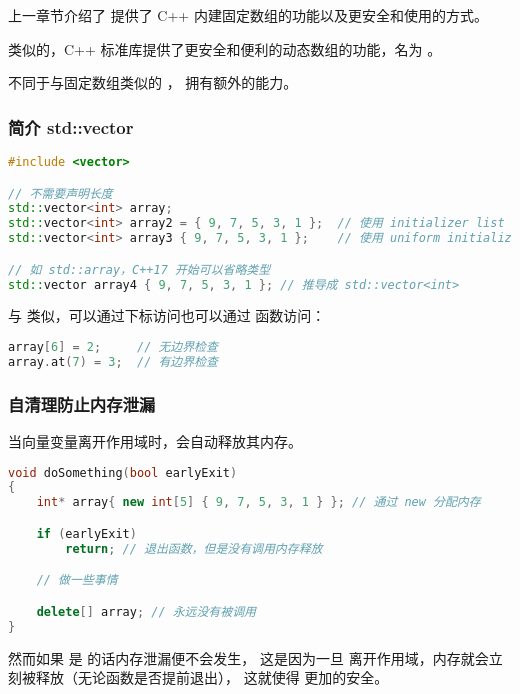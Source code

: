 \documentclass[../../LearnCpp.tex]{subfiles}
\begin{document}

上一章节介绍了  提供了 C++ 内建固定数组的功能以及更安全和使用的方式。

类似的，C++ 标准库提供了更安全和便利的动态数组的功能，名为 。

不同于与固定数组类似的 ， 拥有额外的能力。

\subsubsection*{简介 std::vector}

\begin{lstlisting}[language=C++]
#include <vector>

// 不需要声明长度
std::vector<int> array;
std::vector<int> array2 = { 9, 7, 5, 3, 1 };  // 使用 initializer list 初始化数组 (before C++11)
std::vector<int> array3 { 9, 7, 5, 3, 1 };    // 使用 uniform initialization 初始化数组

// 如 std::array，C++17 开始可以省略类型
std::vector array4 { 9, 7, 5, 3, 1 }; // 推导成 std::vector<int>
\end{lstlisting}

与  类似，可以通过下标访问也可以通过  函数访问：

\begin{lstlisting}[language=C++]
array[6] = 2;     // 无边界检查
array.at(7) = 3;  // 有边界检查
\end{lstlisting}

\subsubsection*{自清理防止内存泄漏}

当向量变量离开作用域时，会自动释放其内存。

\begin{lstlisting}[language=C++]
void doSomething(bool earlyExit)
{
    int* array{ new int[5] { 9, 7, 5, 3, 1 } }; // 通过 new 分配内存

    if (earlyExit)
        return; // 退出函数，但是没有调用内存释放

    // 做一些事情

    delete[] array; // 永远没有被调用
}
\end{lstlisting}

然而如果  是  的话内存泄漏便不会发生，
这是因为一旦  离开作用域，内存就会立刻被释放（无论函数是否提前退出），
这就使得  更加的安全。
\end{document}
